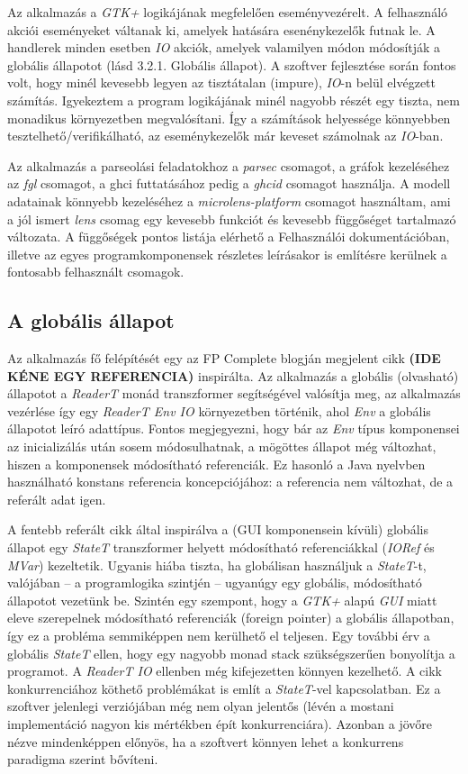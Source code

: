 Az alkalmazás a \textit{GTK+} logikájának megfelelően eseményvezérelt. A felhasználó akciói eseményeket váltanak ki, amelyek hatására esenénykezelők futnak le. A handlerek minden esetben \textit{IO} akciók, amelyek valamilyen módon módosítják a globális állapotot (lásd 3.2.1. Globális állapot). A szoftver fejlesztése során fontos volt, hogy minél kevesebb legyen az tisztátalan (impure), \textit{IO}-n belül elvégzett számítás. Igyekeztem a program logikájának minél nagyobb részét egy tiszta, nem monadikus környezetben megvalósítani. Így a számítások helyessége könnyebben tesztelhető/verifikálható, az eseménykezelők már keveset számolnak az \textit{IO}-ban.

Az alkalmazás a parseolási feladatokhoz a \textit{parsec} csomagot, a gráfok kezeléséhez az \textit{fgl} csomagot, a ghci futtatásához pedig a \textit{ghcid} csomagot használja. A modell adatainak könnyebb kezeléséhez a \textit{microlens-platform} csomagot használtam, ami a jól ismert \textit{lens} csomag egy kevesebb funkciót és kevesebb függőséget tartalmazó változata. A függőségek pontos listája elérhető a Felhasználói dokumentációban, illetve az egyes programkomponensek részletes leírásakor is említésre kerülnek a fontosabb felhasznált csomagok.

\subsection{A globális állapot}

Az alkalmazás fő felépítését egy az FP Complete blogján megjelent cikk \textbf{(IDE KÉNE EGY REFERENCIA)} inspirálta. 
Az alkalmazás a globális (olvasható) állapotot a \textit{ReaderT} monád transzformer segítségével valósítja meg, az alkalmazás vezérlése így egy \textit{ReaderT Env IO} környezetben történik, ahol \textit{Env} a globális állapotot leíró adattípus. Fontos megjegyezni, hogy bár az \textit{Env} típus komponensei az inicializálás után sosem módosulhatnak, a mögöttes állapot még változhat, hiszen a komponensek módosítható referenciák. Ez hasonló a Java nyelvben használható konstans referencia koncepciójához: a referencia nem változhat, de a referált adat igen.

A fentebb referált cikk által inspirálva a (GUI komponensein kívüli) globális állapot egy \textit{StateT} transzformer helyett módosítható referenciákkal (\textit{IORef} és \textit{MVar}) kezeltetik. Ugyanis hiába tiszta, ha globálisan használjuk a \textit{StateT}-t, valójában -- a programlogika szintjén -- ugyanúgy egy globális, módosítható állapotot vezetünk be. Szintén egy szempont, hogy a \textit{GTK+} alapú \textit{GUI} miatt eleve szerepelnek módosítható referenciák (foreign pointer) a globális állapotban, így ez a probléma semmiképpen nem kerülhető el teljesen. Egy további érv a globális \textit{StateT} ellen, hogy egy nagyobb monad stack szükségszerűen bonyolítja a programot. A \textit{ReaderT IO} ellenben még kifejezetten könnyen kezelhető. A cikk konkurrenciához köthető problémákat is említ a \textit{StateT}-vel kapcsolatban. Ez a szoftver jelenlegi verziójában még nem olyan jelentős (lévén a mostani implementáció nagyon kis mértékben épít konkurrenciára). Azonban a jövőre nézve mindenképpen előnyös, ha a szoftvert könnyen lehet a konkurrens paradigma szerint bővíteni.

